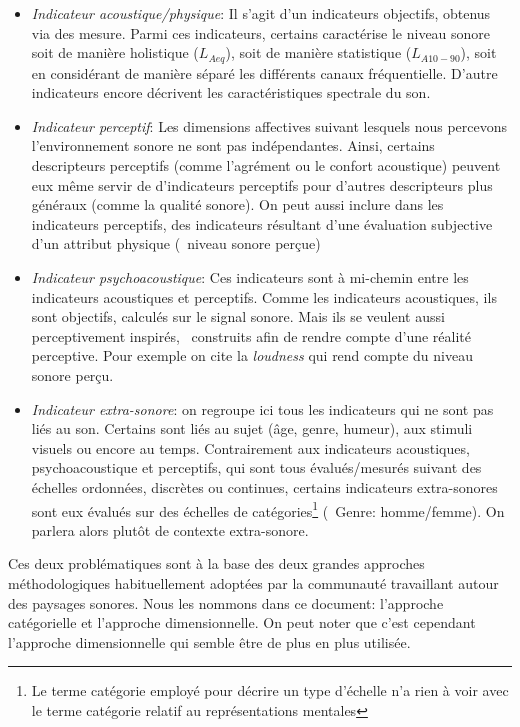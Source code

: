 \begin{itemize}
\begin{itemize}
\item \emph{Indicateur acoustique/physique}: Il s'agit d'un indicateurs objectifs, obtenus via des mesure. Parmi ces indicateurs, certains caractérise le niveau sonore soit de manière holistique ($L_{Aeq}$), soit de manière statistique ($L_{A10-90}$), soit en considérant de manière séparé les différents canaux fréquentielle. D'autre indicateurs encore décrivent les caractéristiques spectrale du son.
\item \emph{Indicateur perceptif}: Les dimensions affectives suivant lesquels nous percevons l'environnement sonore ne sont pas indépendantes. Ainsi, certains descripteurs perceptifs (comme l'agrément ou le confort acoustique) peuvent eux même servir de d'indicateurs perceptifs pour d'autres descripteurs plus généraux (comme la qualité sonore). On peut aussi inclure dans les indicateurs perceptifs, des indicateurs résultant d'une évaluation subjective d'un attribut physique (\eg~niveau sonore perçue) 
\item \emph{Indicateur psychoacoustique}: Ces indicateurs sont à mi-chemin entre les indicateurs acoustiques et perceptifs. Comme les indicateurs acoustiques, ils sont objectifs, calculés sur le signal sonore. Mais ils se veulent aussi perceptivement inspirés, \ie~construits afin de rendre compte d'une réalité perceptive. Pour exemple on cite la \emph{loudness} qui rend compte du niveau sonore perçu.
\item \emph{Indicateur extra-sonore}: on regroupe ici tous les indicateurs qui ne sont pas liés au son. Certains sont liés au sujet (âge, genre, humeur), aux stimuli visuels ou encore au temps. Contrairement aux indicateurs acoustiques, psychoacoustique et perceptifs, qui sont tous évalués/mesurés suivant des échelles ordonnées, discrètes ou continues, certains indicateurs extra-sonores sont eux évalués sur des échelles de catégories\footnote{Le terme catégorie employé pour décrire un type d'échelle n'a rien à voir avec le terme catégorie relatif au représentations mentales} (\eg~Genre: homme/femme). On parlera alors plutôt de contexte extra-sonore.
\end{itemize}

\end{itemize}

Ces deux problématiques sont à la base des deux grandes approches  méthodologiques habituellement adoptées par la communauté travaillant autour des paysages sonores. Nous les nommons dans ce document: l'approche catégorielle et l'approche dimensionnelle.
On peut noter que c'est cependant l'approche dimensionnelle qui semble être de plus en plus utilisée. \\


